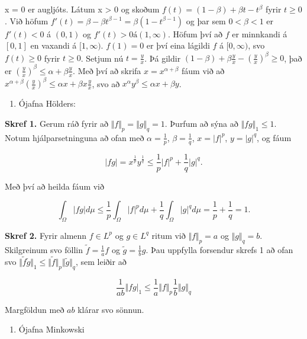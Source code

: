 \documentclass[]{book}
\providecommand{\tightlist}{%
  \setlength{\itemsep}{0pt}\setlength{\parskip}{0pt}}
\begin{document}
x = 0 er augljóts. Látum x \textgreater{} 0 og skoðum \(f(t) = (1 - \beta) + \beta t - t^\beta\) fyrir \(t\geq0\). Við höfum \(f'(t) = \beta - \beta t^{\beta-1} = \beta(1 - t^{\beta-1})\) og þar sem \(0<\beta<1\) er \(f'(t) < 0\) á \((0,1)\) og \(f'(t) > 0 á (1, \infty)\). Höfum því að \(f\) er minnkandi á \([0,1]\) en vaxandi á \([1, \infty)\). \(f(1) = 0\) er því eina lágildi \(f\) á \([0,\infty)\), svo \(f(t)\geq0\) fyrir \(t\geq0\). Setjum nú \(t=\frac yx\). Þá gildir \((1 - \beta) + \beta\frac yx - (\frac yx)^\beta \geq 0\), það er \((\frac yx)^\beta \leq\alpha + \beta \frac yx\). Með því að skrifa \(x=x^{\alpha+\beta}\) fáum við að \(x^{\alpha+\beta}(\frac yx)^\beta\leq\alpha x + \beta x\frac yx\), svo að \(x^\alpha y^\beta \leq \alpha x + \beta y\).

\begin{enumerate}
\def\labelenumi{\arabic{enumi}.}
\tightlist
\item
  Ójafna Hölders:
\end{enumerate}

\textbf{Skref 1.} Gerum ráð fyrir að \(\Vert f\Vert_p = \Vert g\Vert_q = 1\). Þurfum að sýna að \(\Vert fg\Vert_1\leq1\). Notum hjálparsetninguna að ofan með \(\alpha =\frac1p\), \(\beta = \frac1q\), \(x=\vert f\vert^p\), \(y = \vert g\vert^q\), og fáum

\[
\vert fg\vert = x^{\frac1p}y^{\frac1q} \leq \frac1p\vert f\vert^p + \frac1q\vert g\vert^q.
\]

Með því að heilda fáum við

\[
\int_\Omega\vert fg\vert d\mu\leq\frac1p\int_\Omega\vert f\vert^pd\mu + \frac1q\int_\Omega\vert g\vert^qd\mu = \frac1p + \frac1q = 1.
\]

\textbf{Skref 2.} Fyrir almenn \(f\in L^p\) og \(g\in L^q\) ritum við \(\Vert f\Vert_p = a\) og \(\Vert g\Vert_q = b\). Skilgreinum svo föllin \(\tilde f = \frac1a f\) og \(\tilde g = \frac1bg\). Þau uppfylla forsendur skrefs 1 að ofan svo \(\Vert\tilde f\tilde g\Vert_1\leq\Vert\tilde f\Vert_p\Vert\tilde g\Vert_q\), sem leiðir að

\[
\frac{1}{ab}\Vert fg\vert_1 \leq \frac1a\Vert f\Vert_p\frac1b\Vert g\Vert_q
\]

Margföldun með \(ab\) klárar svo sönnun.

\begin{enumerate}
\def\labelenumi{\arabic{enumi}.}
\setcounter{enumi}{1}
\tightlist
\item
  Ójafna Minkowski
\end{enumerate}
\end{document}
